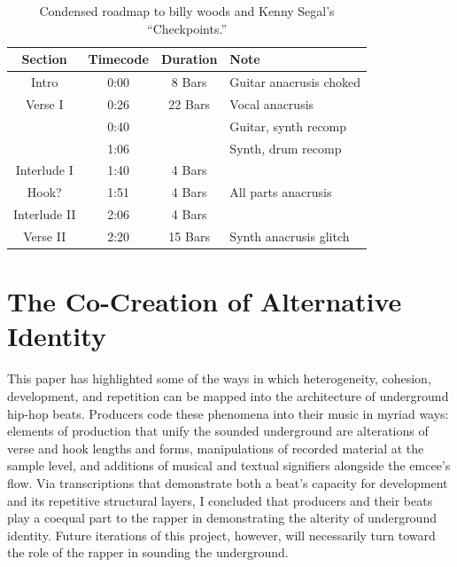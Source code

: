 \begin{table}[ht]
    \centering
    \begin{tabular}{|c|c|c|l|}
        \hline
         Section      & Timecode & Duration & Note                          \\ \hline
         Intro        & 0:00     & 8 Bars   & Guitar anacrusis choked       \\ \hline
         Verse I      & 0:26     & 22 Bars  & Vocal anacrusis               \\ \hline
                      & 0:40     &          & Guitar, synth recomp          \\ \hline
                      & 1:06     &          & Synth, drum recomp            \\ \hline
         Interlude I  & 1:40     & 4 Bars   &                               \\ \hline
         Hook?        & 1:51     & 4 Bars   & All parts anacrusis           \\ \hline
         Interlude II & 2:06     & 4 Bars   &                               \\ \hline
         Verse II     & 2:20     & 15 Bars  & Synth anacrusis glitch        \\ \hline
         
    \end{tabular}
    \caption{Condensed roadmap to billy woods and Kenny Segal's ``Checkpoints.''}
    \label{tab:checkpoints}
\end{table}


\section{The Co-Creation of Alternative Identity}
This paper has highlighted some of the ways in which heterogeneity, cohesion, development, and repetition can be mapped into the architecture of underground hip-hop beats. Producers code these phenomena into their music in myriad ways: elements of production that unify the sounded underground are alterations of verse and hook lengths and forms, manipulations of recorded material at the sample level, and additions of musical and textual signifiers alongside the emcee's flow. Via transcriptions that demonstrate both a beat's capacity for development and its repetitive structural layers, I concluded that producers and their beats play a coequal part to the rapper in demonstrating the alterity of underground identity. Future iterations of this project, however, will necessarily turn toward the role of the rapper in sounding the underground.